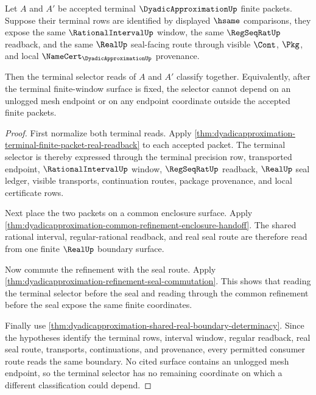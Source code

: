 \begin{theorem}
\label{thm:dyadicapproximation-finite-packet-terminal-selector-determinacy}
Let $A$ and $A'$ be accepted terminal $\DyadicApproximationUp$ finite packets.
Suppose their terminal rows are identified by displayed $\hsame$ comparisons,
they expose the same $\RationalIntervalUp$ window, the same $\RegSeqRatUp$
readback, and the same $\RealUp$ seal-facing route through visible $\Cont$,
$\Pkg$, and local $\NameCert_{\DyadicApproximationUp}$ provenance.

Then the terminal selector reads of $A$ and $A'$ classify together. Equivalently,
after the terminal finite-window surface is fixed, the selector cannot depend
on an unlogged mesh endpoint or on any endpoint coordinate outside the accepted
finite packets.
\end{theorem}
\begin{proof}
First normalize both terminal reads. Apply
\autoref{thm:dyadicapproximation-terminal-finite-packet-real-readback} to each
accepted packet. The terminal selector is thereby expressed through the
terminal precision row, transported endpoint, $\RationalIntervalUp$ window,
$\RegSeqRatUp$ readback, $\RealUp$ seal ledger, visible transports,
continuation routes, package provenance, and local certificate rows.

Next place the two packets on a common enclosure surface. Apply
\autoref{thm:dyadicapproximation-common-refinement-enclosure-handoff}. The
shared rational interval, regular-rational readback, and real seal route are
therefore read from one finite $\RealUp$ boundary surface.

Now commute the refinement with the seal route. Apply
\autoref{thm:dyadicapproximation-refinement-seal-commutation}. This shows that
reading the terminal selector before the seal and reading through the common
refinement before the seal expose the same finite coordinates.

Finally use
\autoref{thm:dyadicapproximation-shared-real-boundary-determinacy}. Since the
hypotheses identify the terminal rows, interval window, regular readback, real
seal route, transports, continuations, and provenance, every permitted consumer
route reads the same boundary. No cited surface contains an unlogged mesh
endpoint, so the terminal selector has no remaining coordinate on which a
different classification could depend.
\end{proof}

